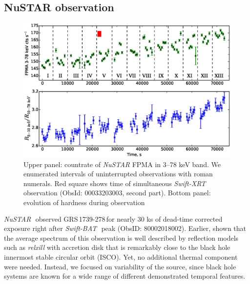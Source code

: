 \documentclass[a4paper,fleqn,usenatbib]{mnras}
\def\grs{{GRS\,1739-278\,}}
\def\swiftx{{\em Swift-XRT\,}}
\def\swiftb{{\em Swift-BAT\,}}
\def\nustar{{\em NuSTAR\,}}
\begin{document}
\subsection{NuSTAR observation}
\label{sec:nust} 
\begin{figure}
\centerline{\includegraphics[scale=0.7]{nuAlc_color_v04.eps}}
\caption{Upper panel: countrate of \nustar\,FPMA in 3--78 keV band. We enumerated intervals of uninterrupted observations with roman numerals. Red square shows time of simultaneous \swiftx observation (ObsId: 00033203003, second part). Bottom panel: evolution of hardness during observation} 
\label{fig:nust_lc}
\end{figure} 
\nustar\, observed \grs for nearly 30 ks of dead-time corrected exposure right after \swiftb\, peak (ObsID: 80002018002). Earlier, \cite{miller15_nust} shown that the average spectrum of this observation is well described by reflection models such as {\it relxill} \citep{dauser14,dauser16} with accretion disk that is remarkably close to the black hole innermost stable circular orbit (ISCO). Yet, no additional thermal component were needed. Instead, we focused on variability of the source, since black hole systems are known for a wide range of different demonstrated temporal features. 
\end{document}

